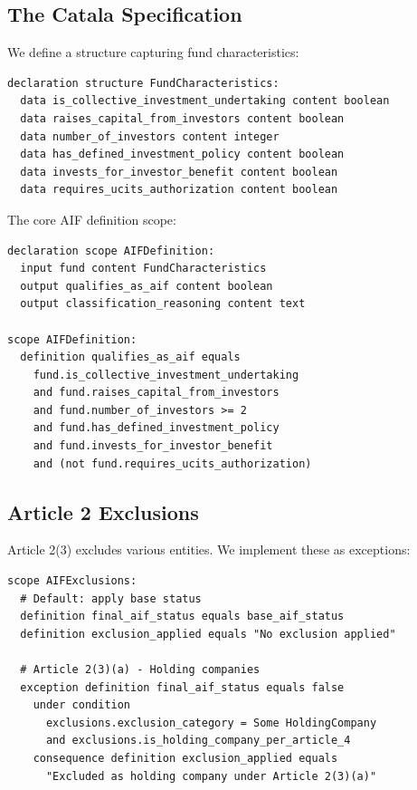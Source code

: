 \subsection{The Catala Specification}
\label{sec:aif-spec}

We define a structure capturing fund characteristics:

\begin{lstlisting}
declaration structure FundCharacteristics:
  data is_collective_investment_undertaking content boolean
  data raises_capital_from_investors content boolean
  data number_of_investors content integer
  data has_defined_investment_policy content boolean
  data invests_for_investor_benefit content boolean
  data requires_ucits_authorization content boolean
\end{lstlisting}

The core AIF definition scope:

\begin{lstlisting}
declaration scope AIFDefinition:
  input fund content FundCharacteristics
  output qualifies_as_aif content boolean
  output classification_reasoning content text

scope AIFDefinition:
  definition qualifies_as_aif equals
    fund.is_collective_investment_undertaking
    and fund.raises_capital_from_investors
    and fund.number_of_investors >= 2
    and fund.has_defined_investment_policy
    and fund.invests_for_investor_benefit
    and (not fund.requires_ucits_authorization)
\end{lstlisting}

\subsection{Article 2 Exclusions}
\label{sec:aif-exclusions}

Article 2(3) excludes various entities. We implement these as exceptions:

\begin{lstlisting}
scope AIFExclusions:
  # Default: apply base status
  definition final_aif_status equals base_aif_status
  definition exclusion_applied equals "No exclusion applied"

  # Article 2(3)(a) - Holding companies
  exception definition final_aif_status equals false
    under condition
      exclusions.exclusion_category = Some HoldingCompany
      and exclusions.is_holding_company_per_article_4
    consequence definition exclusion_applied equals
      "Excluded as holding company under Article 2(3)(a)"
\end{lstlisting}


